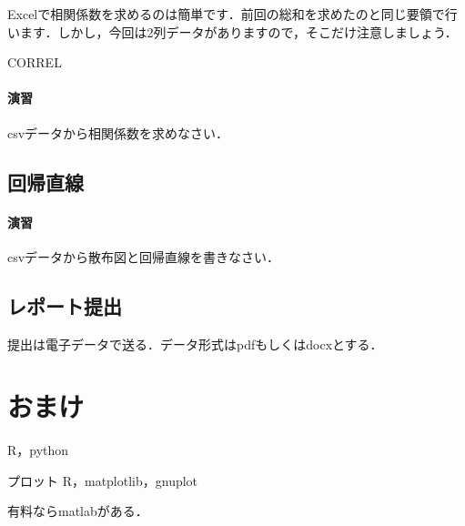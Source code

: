 \documentclass[12pt, a4j]{jreport}
\begin{document}
Excelで相関係数を求めるのは簡単です．前回の総和を求めたのと同じ要領で行います．しかし，今回は2列データがありますので，そこだけ注意しましょう．

CORREL

\paragraph{演習}
csvデータから相関係数を求めなさい．

\subsection{回帰直線}



\paragraph{演習}

csvデータから散布図と回帰直線を書きなさい．

\subsection{レポート提出}

提出は電子データで送る．データ形式はpdfもしくはdocxとする．


\section{おまけ}
R，python

プロット
R，matplotlib，gnuplot


有料ならmatlabがある．
\end{document}
